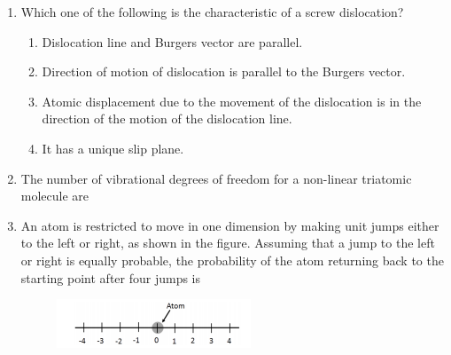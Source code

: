 \documentclass[a4paper,10pt]{article}
\begin{document}
\begin{enumerate}
    \item Which one of the following is the characteristic of a screw dislocation?
    \hfill{}
    \begin{enumerate}[label=\Alph*)]
        \item Dislocation line and Burgers vector are parallel.
        \item Direction of motion of dislocation is parallel to the Burgers vector.
        \item Atomic displacement due to the movement of the dislocation is in the direction of the motion of the dislocation line.
        \item It has a unique slip plane.
    \end{enumerate}

    \item The number of vibrational degrees of freedom for a non-linear triatomic molecule are
    \hfill{}
    \begin{enumerate}[label=\Alph*)]
    \end{enumerate}

    \item An atom is restricted to move in one dimension by making unit jumps either to the left or right, as shown in the figure. Assuming that a jump to the left or right is equally probable, the probability of the atom returning back to the starting point after four jumps is
    \begin{figure}[H] \centering \includegraphics[width=0.6\columnwidth]{q7_material_2018.png} \caption*{} \label{fig:q7_material_2018} \end{figure}
    \hfill{}
    \begin{enumerate}[label=\Alph*)]
    \end{enumerate}


\end{enumerate}
\end{document}
